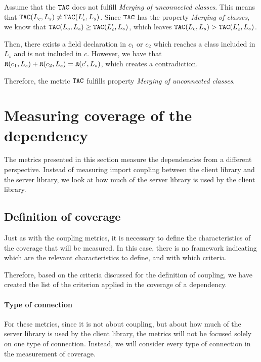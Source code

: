 Assume that the $\verb|TAC|$ does not fulfill \textit{Merging of unconnected classes}. This means that $\verb|TAC|(L_c, L_s) \neq \verb|TAC|(L_c', L_s)$. Since $\verb|TAC|$ has the property \textit{Merging of classes}, we know that $\verb|TAC|(L_c, L_s) \geq \verb|TAC|(L_c', L_s)$, which leaves $\verb|TAC|(L_c, L_s) > \verb|TAC|(L_c', L_s)$.

Then, there exists a field declaration in $c_1$ or $c_2$ which reaches a class included in $L_s$ and is not included in $c$. However, we have that $\verb|R|(c_1, L_s) + \verb|R|(c_2, L_s) = \verb|R|(c', L_s)$, which creates a contradiction.

Therefore, the metric $\verb|TAC|$ fulfills property \textit{Merging of unconnected classes}.

\section{Measuring coverage of the dependency}\label{sec:coverageMetrics}
The metrics presented in this section measure the dependencies from a different perspective. Instead of measuring import coupling between the client library and the server library, we look at how much of the server library is used by the client library.


\subsection{Definition of coverage}\label{subsect:usage-definition}
Just as with the coupling metrics, it is necessary to define the characteristics of the coverage that will be measured. In this case, there is no framework indicating which are the relevant characteristics to define, and with which criteria.

Therefore, based on the criteria discussed for the definition of coupling, we have created the list of the criterion applied in the coverage of a dependency.

\paragraph{Type of connection}
For these metrics, since it is not about coupling, but about how much of the server library is used by the client library, the metrics will not be focused solely on one type of connection. Instead, we will consider every type of connection in the measurement of coverage.

